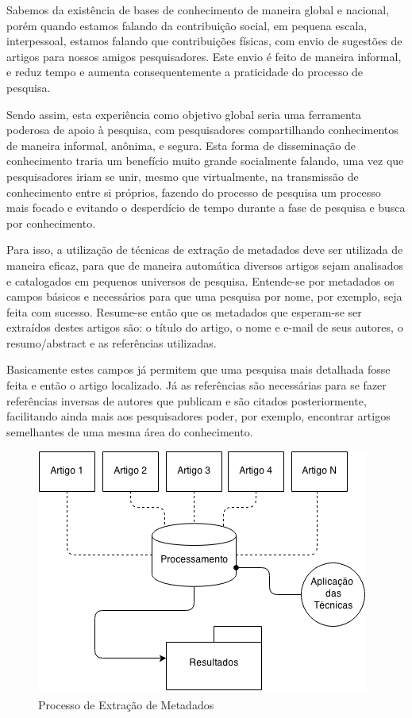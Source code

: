 \documentclass[
	12pt,               %
	openright,          %
	twoside,            %
	a4paper,            %
	english,            %
	brazil              %
	]{abntex2}
\begin{document}
Sabemos da existência de bases de conhecimento de maneira global e nacional, porém quando estamos falando da contribuição social, em pequena escala, interpessoal, estamos falando que contribuições físicas, com envio de sugestões de artigos para nossos amigos pesquisadores. Este envio é feito de maneira informal, e reduz tempo e aumenta consequentemente a praticidade do processo de pesquisa.

Sendo assim, esta experiência como objetivo global seria uma ferramenta poderosa de apoio à pesquisa, com pesquisadores compartilhando conhecimentos de maneira informal, anônima, e segura. Esta forma de disseminação de conhecimento traria um benefício muito grande socialmente falando, uma vez que pesquisadores iriam se unir, mesmo que virtualmente, na transmissão de conhecimento entre si próprios, fazendo do processo de pesquisa um processo mais focado e evitando o desperdício de tempo durante a fase de pesquisa e busca por conhecimento.

Para isso, a utilização de técnicas de extração de metadados deve ser utilizada de maneira eficaz, para que de maneira automática diversos artigos sejam analisados e catalogados em pequenos universos de pesquisa. Entende-se por metadados os campos básicos e necessários para que uma pesquisa por nome, por exemplo, seja feita com sucesso. Resume-se então que os metadados que esperam-se ser extraídos destes artigos são: o título do artigo, o nome e e-mail de seus autores, o resumo/abstract e as referências utilizadas.

Basicamente estes campos já permitem que uma pesquisa mais detalhada fosse feita e então o artigo localizado. Já as referências são necessárias para se fazer referências inversas de autores que publicam e são citados posteriormente, facilitando ainda mais aos pesquisadores poder, por exemplo, encontrar artigos semelhantes de uma mesma área do conhecimento.

\begin{figure}
\centering
\caption{Processo de Extração de Metadados}
\label{fig:introducao}
\includegraphics[width=0.7\linewidth]{./assets/introducao}
\end{figure}
\end{document}
